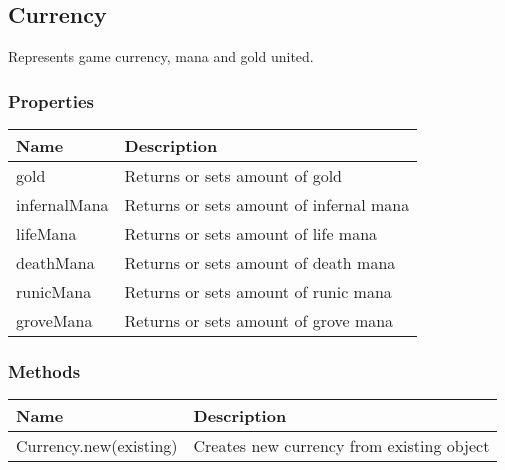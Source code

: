 \subsection{Currency}
\label{Currency}
Represents game currency, mana and gold united.
\subsubsection{Properties}
\begin{center}
\begin{tabularx}{\linewidth}{| l | X |}
\hline
\textbf{Name} & \textbf{Description} \\
\hline
gold & Returns or sets amount of gold\\
\hline
infernalMana & Returns or sets amount of infernal mana\\
\hline
lifeMana & Returns or sets amount of life mana\\
\hline
deathMana & Returns or sets amount of death mana\\
\hline
runicMana & Returns or sets amount of runic mana\\
\hline
groveMana & Returns or sets amount of grove mana\\
\hline
\end{tabularx}
\end{center}

\subsubsection{Methods}
\begin{center}
\begin{tabularx}{\linewidth}{| l | X |}
\hline
\textbf{Name} & \textbf{Description} \\
\hline
Currency.new(existing) & Creates new currency from existing object\\
\hline
\end{tabularx}
\end{center}